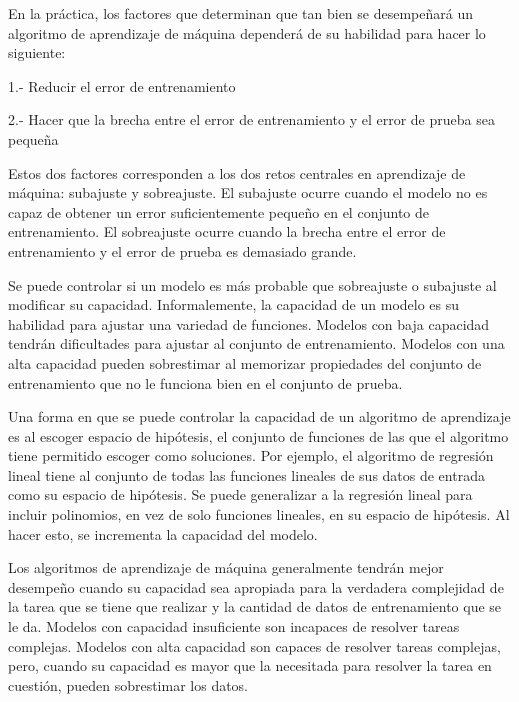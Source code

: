 \vspace{1em}

En la práctica, los factores que determinan que tan bien se desempeñará un algoritmo de aprendizaje de máquina dependerá de su habilidad para hacer lo siguiente:

1.- Reducir el error de entrenamiento

2.- Hacer que la brecha entre el error de entrenamiento y el error de prueba sea pequeña

\vspace{1em}

Estos dos factores corresponden a los dos retos centrales en aprendizaje de máquina: subajuste y sobreajuste. El subajuste ocurre cuando el modelo no es capaz de obtener un error suficientemente pequeño en el conjunto de entrenamiento. El sobreajuste ocurre cuando la brecha entre el error de entrenamiento y el error de prueba es demasiado grande.

\vspace{1em}

Se puede controlar si un modelo es más probable que sobreajuste o subajuste al modificar su capacidad. Informalemente, la capacidad de un modelo es su habilidad para ajustar una variedad de funciones. Modelos con baja capacidad tendrán dificultades para ajustar al conjunto de entrenamiento. Modelos con una alta capacidad pueden sobrestimar al memorizar propiedades del conjunto de entrenamiento que no le funciona bien en el conjunto de prueba.
\cite{goodfellow-et-al-2016}

\vspace{1em}

Una forma en que se puede controlar la capacidad de un algoritmo de aprendizaje es al escoger espacio de hipótesis, el conjunto de funciones de las que el algoritmo tiene permitido escoger como soluciones. Por ejemplo, el algoritmo de regresión lineal tiene al conjunto de todas las funciones lineales de sus datos de entrada como su espacio de hipótesis. Se puede generalizar a la regresión lineal para incluir polinomios, en vez de solo funciones lineales, en su espacio de hipótesis. Al hacer esto, se incrementa la capacidad del modelo.

\vspace{1em}

Los algoritmos de aprendizaje de máquina generalmente tendrán mejor desempeño cuando su capacidad sea apropiada para la verdadera complejidad de la tarea que se tiene que realizar y la cantidad de datos de entrenamiento que se le da. Modelos con capacidad insuficiente son incapaces de resolver tareas complejas. Modelos con alta capacidad son capaces de resolver tareas complejas, pero, cuando su capacidad es mayor que la necesitada para resolver la tarea en cuestión, pueden sobrestimar los datos.

